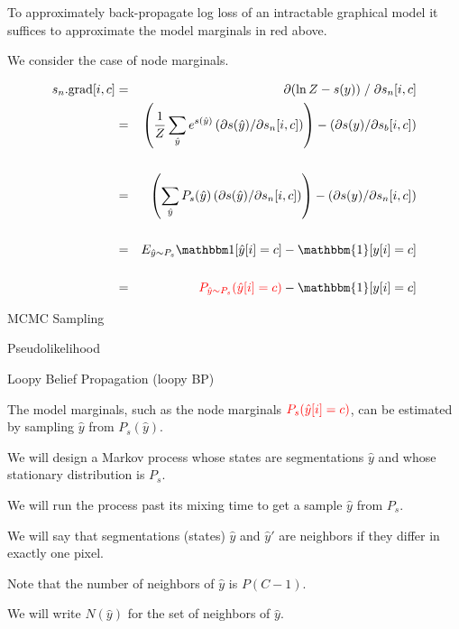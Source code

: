 {\vfill
To approximately back-propagate log loss of an intractable graphical model it suffices to approximate
{\color{red} the model marginals} in red above.


We consider the case of node marginals.

{\huge \begin{eqnarray*}
    s_n.\mathrm{grad}[i,c] & = & \partial (\ln Z - s(y))\;/\;\partial s_n[i,c] \\
    & = & \left(\frac{1}{Z} \sum_{\hat{y}} e^{s(\hat{y})} \left(\partial s(\hat{y})/\partial s_n[i,c]\right)\right)
    - \left(\partial s(y) /\partial s_b[i,c]\right)    \\
    \\
    & = & \left(\sum_{\hat{y}} P_s(\hat{y}) \left(\partial s(\hat{y})/\partial s_n[i,c]\right)\right)
    - \left(\partial s(y) /\partial s_n[i,c]\right)    \\
    \\
    & = & E_{\hat{y} \sim P_s}\bbone[\hat{y}[i] = c]
    - \mathbbm{1}[y[i] = c] \\
    \\
    & = & {\color{red} P_{\hat{y} \sim P_s}(\hat{y}[i] = c)}
      - \mathbbm{1}[y[i] = c]
\end{eqnarray*}
}


MCMC Sampling

\vfill
Pseudolikelihood

\vfill
Loopy Belief Propagation (loopy BP)

The model marginals, such as the node marginals
 ${\color{red} P_s(\hat{y}[i]=c)}$, can be estimated by sampling $\hat{y}$ from $P_s(\hat{y})$.

\vfill
We will design a Markov process whose states are segmentations $\hat{y}$ and whose stationary distribution is $P_s$.

\vfill
We will run the process past its mixing time to get a sample $\hat{y}$ from $P_s$.


We will say that segmentations (states) $\hat{y}$ and $\hat{y}'$ are neighbors if they differ in exactly one pixel.

\vfill
Note that the number of neighbors of $\hat{y}$ is $P(C-1)$.

\vfill
We will write $N(\hat{y})$ for the set of neighbors of $\hat{y}$.


}
